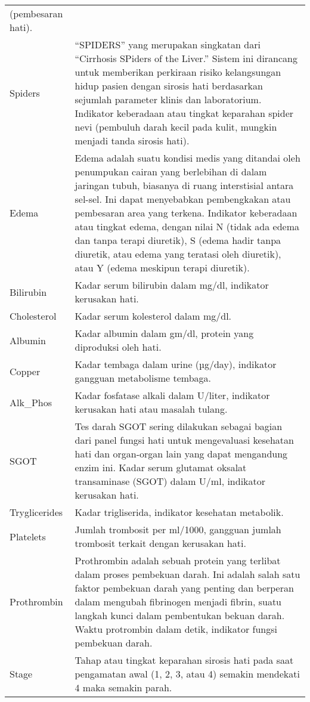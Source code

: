\documentclass[
  letterpaper,
]{krantz}
\begin{document}
\begin{longtable}[]{@{}
  >{\raggedright\arraybackslash}p{}
  >{\raggedright\arraybackslash}p{}@{}}
(pembesaran hati). \\
Spiders & ``SPIDERS'' yang merupakan singkatan dari ``Cirrhosis SPiders
of the Liver.'' Sistem ini dirancang untuk memberikan perkiraan risiko
kelangsungan hidup pasien dengan sirosis hati berdasarkan sejumlah
parameter klinis dan laboratorium. Indikator keberadaan atau tingkat
keparahan spider nevi (pembuluh darah kecil pada kulit, mungkin menjadi
tanda sirosis hati). \\
Edema & Edema adalah suatu kondisi medis yang ditandai oleh penumpukan
cairan yang berlebihan di dalam jaringan tubuh, biasanya di ruang
interstisial antara sel-sel. Ini dapat menyebabkan pembengkakan atau
pembesaran area yang terkena. Indikator keberadaan atau tingkat edema,
dengan nilai N (tidak ada edema dan tanpa terapi diuretik), S (edema
hadir tanpa diuretik, atau edema yang teratasi oleh diuretik), atau Y
(edema meskipun terapi diuretik). \\
Bilirubin & Kadar serum bilirubin dalam mg/dl, indikator kerusakan
hati. \\
Cholesterol & Kadar serum kolesterol dalam mg/dl. \\
Albumin & Kadar albumin dalam gm/dl, protein yang diproduksi oleh
hati. \\
Copper & Kadar tembaga dalam urine (µg/day), indikator gangguan
metabolisme tembaga. \\
Alk\_Phos & Kadar fosfatase alkali dalam U/liter, indikator kerusakan
hati atau masalah tulang. \\
SGOT & Tes darah SGOT sering dilakukan sebagai bagian dari panel fungsi
hati untuk mengevaluasi kesehatan hati dan organ-organ lain yang dapat
mengandung enzim ini. Kadar serum glutamat oksalat transaminase (SGOT)
dalam U/ml, indikator kerusakan hati. \\
Tryglicerides & Kadar trigliserida, indikator kesehatan metabolik. \\
Platelets & Jumlah trombosit per ml/1000, gangguan jumlah trombosit
terkait dengan kerusakan hati. \\
Prothrombin & Prothrombin adalah sebuah protein yang terlibat dalam
proses pembekuan darah. Ini adalah salah satu faktor pembekuan darah
yang penting dan berperan dalam mengubah fibrinogen menjadi fibrin,
suatu langkah kunci dalam pembentukan bekuan darah. Waktu protrombin
dalam detik, indikator fungsi pembekuan darah. \\
Stage & Tahap atau tingkat keparahan sirosis hati pada saat pengamatan
awal (1, 2, 3, atau 4) semakin mendekati 4 maka semakin parah. \\
\end{longtable}
\end{document}
